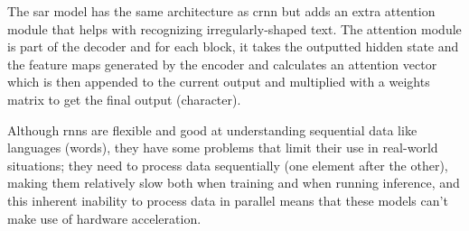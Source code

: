 \label{sar}The \gls{sar} model \cite{li_show_2019} has the same architecture as \gls{crnn} but adds an extra attention module that helps with recognizing irregularly-shaped text. The attention module is part of the decoder and for each block, it takes the outputted hidden state and the feature maps generated by the encoder and calculates an attention vector which is then appended to the current output and multiplied with a weights matrix to get the final output (character).

Although \gls{rnn}s are flexible and good at understanding sequential data like languages (words), they have some problems that limit their use in real-world situations; they need to process data sequentially (one element after the other), making them relatively slow both when training and when running inference, and this inherent inability to process data in parallel means that these models can't make use of hardware acceleration.

